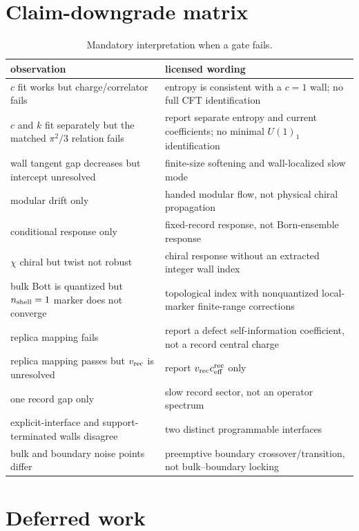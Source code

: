 \documentclass[aps,prx,onecolumn,nofootinbib,superscriptaddress,longbibliography]{revtex4-2}
\begin{document}
\section{Claim-downgrade matrix}

\begin{table}[t]
\caption{Mandatory interpretation when a gate fails.}
\begin{ruledtabular}
\begin{tabular}{p{}p{}}
observation & licensed wording \\
\hline
$c$ fit works but charge/correlator fails & entropy is consistent with a $c=1$ wall; no full CFT identification \\
$c$ and $k$ fit separately but the matched $\pi^2/3$ relation fails & report separate entropy and current coefficients; no minimal $U(1)_1$ identification \\
wall tangent gap decreases but intercept unresolved & finite-size softening and wall-localized slow mode \\
modular drift only & handed modular flow, not physical chiral propagation \\
conditional response only & fixed-record response, not Born-ensemble response \\
$\chi$ chiral but twist not robust & chiral response without an extracted integer wall index \\
bulk Bott is quantized but $n_{\rm shell}=1$ marker does not converge & topological index with nonquantized local-marker finite-range corrections \\
replica mapping fails & report a defect self-information coefficient, not a record central charge \\
replica mapping passes but $v_{\rm rec}$ is unresolved & report $v_{\rm rec}c_{\rm eff}^{\rm rec}$ only \\
one record gap only & slow record sector, not an operator spectrum \\
explicit-interface and support-terminated walls disagree & two distinct programmable interfaces \\
bulk and boundary noise points differ & preemptive boundary crossover/transition, not bulk--boundary locking \\
\end{tabular}
\end{ruledtabular}
\end{table}

\section{Deferred work}
\end{document}
